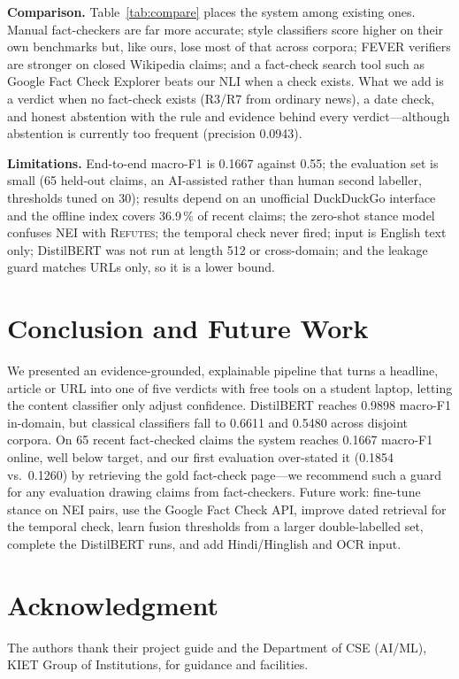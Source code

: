 \documentclass[conference]{IEEEtran}
\begin{document}
\textbf{Comparison.} Table~\ref{tab:compare} places the system among existing ones. Manual fact-checkers are far more accurate; style classifiers score higher on their own benchmarks but, like ours, lose most of that across corpora; FEVER verifiers are stronger on closed Wikipedia claims; and a fact-check search tool such as Google Fact Check Explorer beats our NLI when a check exists. What we add is a verdict when no fact-check exists (R3/R7 from ordinary news), a date check, and honest abstention with the rule and evidence behind every verdict---although abstention is currently too frequent (precision 0.0943).

\textbf{Limitations.} End-to-end macro-F1 is 0.1667 against 0.55; the evaluation set is small (65 held-out claims, an AI-assisted rather than human second labeller, thresholds tuned on 30); results depend on an unofficial DuckDuckGo interface and the offline index covers 36.9\,\% of recent claims; the zero-shot stance model confuses NEI with \textsc{Refutes}; the temporal check never fired; input is English text only; DistilBERT was not run at length 512 or cross-domain; and the leakage guard matches URLs only, so it is a lower bound.

\section{Conclusion and Future Work}\label{sec:conclusion}
We presented an evidence-grounded, explainable pipeline that turns a headline, article or URL into one of five verdicts with free tools on a student laptop, letting the content classifier only adjust confidence. DistilBERT reaches 0.9898 macro-F1 in-domain, but classical classifiers fall to 0.6611 and 0.5480 across disjoint corpora. On 65 recent fact-checked claims the system reaches 0.1667 macro-F1 online, well below target, and our first evaluation over-stated it (0.1854 vs.\ 0.1260) by retrieving the gold fact-check page---we recommend such a guard for any evaluation drawing claims from fact-checkers. Future work: fine-tune stance on NEI pairs, use the Google Fact Check API, improve dated retrieval for the temporal check, learn fusion thresholds from a larger double-labelled set, complete the DistilBERT runs, and add Hindi/Hinglish and OCR input.

\section*{Acknowledgment}
The authors thank their project guide and the Department of CSE (AI/ML), KIET Group of Institutions, for guidance and facilities.



\end{document}

